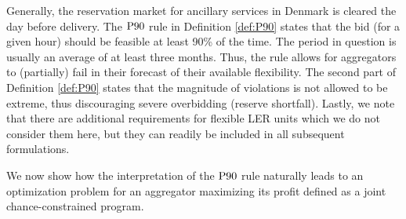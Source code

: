 \documentclass[conference]{IEEEtran}
\begin{document}
Generally, the reservation market for ancillary services in Denmark is cleared the day before delivery. The $\rm{P90}$ rule in Definition \ref{def:P90} states that the bid (for a given hour) should be feasible at least 90\% of the time. The period in question is usually an average of at least three months. Thus, the rule allows for aggregators to (partially) fail in their forecast of their available flexibility. The second part of Definition \ref{def:P90} states that the magnitude of violations is not allowed to be extreme, thus discouraging severe overbidding (reserve shortfall). Lastly, we note that there are additional requirements for flexible \ac{LER} units \cite{energinet} which we do not consider them here, but they can readily be included in all subsequent formulations.

We now show how the interpretation of the $\rm{P90}$ rule naturally leads to an optimization problem for an aggregator maximizing its profit defined as a joint chance-constrained program.

\vspace{1mm}
\end{document}
